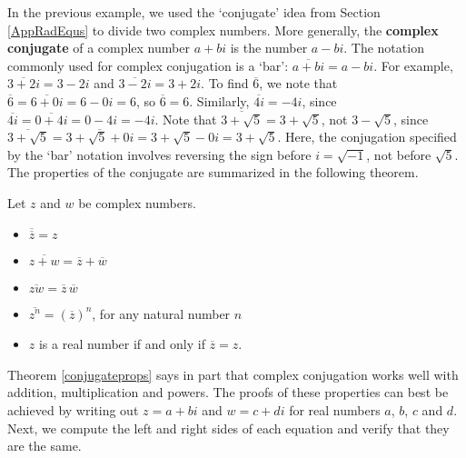 \documentclass{ximera}
\begin{document}
In the previous example, we used the `conjugate' idea from Section \ref{AppRadEqus} to divide two complex numbers.  More generally, the \textbf{complex conjugate} of a complex number $a+bi$ is the number $a-bi$.  The notation commonly used for complex conjugation is a `bar':  $\overline{a+bi} = a-bi$. For example, $\overline{3+2i} = 3-2i$ and $\overline{3-2i} = 3+2i$. To find $\overline{6}$, we note that $\overline{6} = \overline{6+0i}= 6 - 0i = 6$, so $\overline{6} = 6$. Similarly, $\overline{4i} = -4i$, since $\overline{4i} = \overline{0 + 4i} = 0 - 4i =  -4i$.  Note that $\overline{3+\sqrt{5}} = 3 + \sqrt{5}$, not $3 - \sqrt{5}$, since  $\overline{3+\sqrt{5}} = \overline{3+\sqrt{5} + 0i} = 3+\sqrt{5}  - 0i = 3+\sqrt{5}$. Here, the conjugation specified by the `bar' notation involves reversing the sign before $i = \sqrt{-1}$, not before  $\sqrt{5}$.  The properties of the conjugate are summarized in the following theorem.

\medskip

\colorbox{ResultColor}{\bbm

\begin{thm}  \label{conjugateprops} Let $z$ and $w$ be complex numbers. 

\begin{itemize}

\item  $\overline{\overline{z}} = z$

\item  $ \overline{z+w} = \overline{z} + \overline{w}$

\item  $ \overline{zw} = \overline{z} \, \overline{w}$

\item  $\overline{z^{n}} = \left(\overline{z}\right)^n$, for any natural number $n$

\item  $z$ is a real number if and only if $\overline{z} = z$.

\end{itemize}

\end{thm}
\ebm}

\medskip

Theorem \ref{conjugateprops} says in part that complex conjugation works well with addition, multiplication and powers.  The proofs of these properties can best be achieved by writing out $z = a+bi$ and $w = c+di$ for real numbers $a$, $b$, $c$ and $d$.   Next, we compute the left and right sides of each equation and verify that they are the same.  
\end{document}
